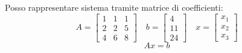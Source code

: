 \begin{center}
\end{center}

\begin{tcolorbox}
	Posso rappresentare sistema tramite matrice di coefficienti:
	\[ A=
		\begin{bmatrix}
			1 & 1 & 1 \\
			2 & 2 & 5 \\
			4 & 6 & 8
		\end{bmatrix}
		\quad
		b = \begin{bmatrix} 4 \\ 11 \\ 24 \end{bmatrix} \quad x= \begin{bmatrix} x_1 \\ x_2 \\ x_3 \end{bmatrix}
	\]
	\[
		Ax = b
	\]

\end{tcolorbox}

